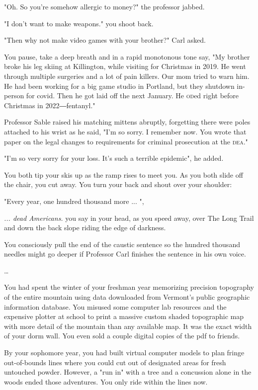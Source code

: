 \documentclass[a5paper, symmetric]{tufte-book}
\begin{document}
"Oh. So you're somehow allergic to money?" the professor jabbed. 

"I don't want to make weapons." you shoot back. 

"Then why not make video games with your brother?" Carl asked.

You pause, take a deep breath and in a rapid monotonous tone say, "My brother broke his leg skiing at Killington, while visiting for Christmas in 2019. He went through multiple surgeries and a lot of pain killers. Our mom tried to warn him. He had been working for a big game studio in Portland, but they shutdown in-person for covid. Then he got laid off the next January. He \textsc{od}ed right before Christmas in 2022―fentanyl."

Professor Sable raised his matching mittens abruptly, forgetting there were poles attached to his wrist as he said, "I'm so sorry. I remember now. You wrote that paper on the legal changes to requirements for criminal prosecution at the \textsc{dea}."

"I'm so very sorry for your loss. It's such a terrible epidemic", he added. 

You both tip your skis up as the ramp rises to meet you. As you both slide off the chair, you cut away. You turn your back and shout over your shoulder:

"Every year, one hundred thousand more ... ",

\textit{... dead Americans.} you say in your head, as you speed away, over The Long Trail and down the back slope riding the edge of darkness.

You consciously pull the end of the caustic sentence so the hundred thousand needles might go deeper if Professor Carl finishes the sentence in his own voice. 

\ldots

You had spent the winter of your freshman year memorizing precision topography of the entire mountain using data downloaded from Vermont's public geographic information database. You misused some computer lab resources and the expensive plotter at school to print a massive custom shaded topographic map with more detail of the mountain than any available map. It was the exact width of your dorm wall. You even sold a couple digital copies of the pdf to friends. 

By your sophomore year, you had built virtual computer models to plan fringe out-of-bounds lines where you could cut out of designated areas for fresh untouched powder. However, a "run in" with a tree and a concussion alone in the woods ended those adventures. You only ride within the lines now.
\end{document}

